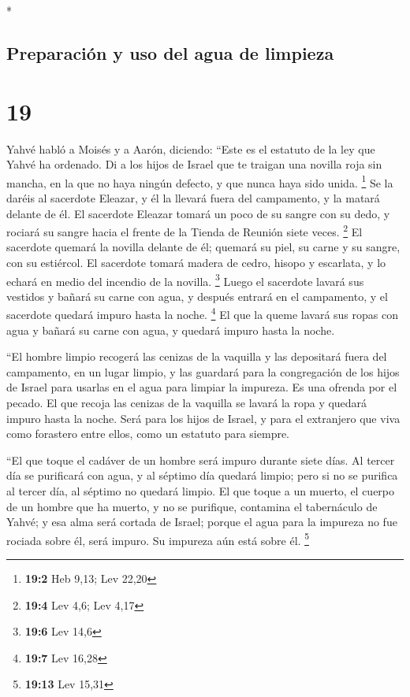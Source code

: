 \begin{paracol}{2}
\begin{otherlanguage}{english}
\end{otherlanguage}

\switchcolumn[0]*

\hypertarget{preparaciuxf3n-y-uso-del-agua-de-limpieza}{%
\subsection{Preparación y uso del agua de
limpieza}\label{preparaciuxf3n-y-uso-del-agua-de-limpieza}}

\hypertarget{section-36}{%
\section{19}\label{section-36}}

 Yahvé habló a Moisés y a Aarón, diciendo: 
``Este es el estatuto de la ley que Yahvé ha ordenado. Di a los hijos de
Israel que te traigan una novilla roja sin mancha, en la que no haya
ningún defecto, y que nunca haya sido unida. \footnote{\textbf{19:2} Heb
  9,13; Lev 22,20}  Se la daréis al sacerdote Eleazar, y
él la llevará fuera del campamento, y la matará delante de él.
 El sacerdote Eleazar tomará un poco de su sangre con su
dedo, y rociará su sangre hacia el frente de la Tienda de Reunión siete
veces. \footnote{\textbf{19:4} Lev 4,6; Lev 4,17}  El
sacerdote quemará la novilla delante de él; quemará su piel, su carne y
su sangre, con su estiércol.  El sacerdote tomará madera
de cedro, hisopo y escarlata, y lo echará en medio del incendio de la
novilla. \footnote{\textbf{19:6} Lev 14,6}  Luego el
sacerdote lavará sus vestidos y bañará su carne con agua, y después
entrará en el campamento, y el sacerdote quedará impuro hasta la noche.
\footnote{\textbf{19:7} Lev 16,28}  El que la queme lavará
sus ropas con agua y bañará su carne con agua, y quedará impuro hasta la
noche.

 ``El hombre limpio recogerá las cenizas de la vaquilla y
las depositará fuera del campamento, en un lugar limpio, y las guardará
para la congregación de los hijos de Israel para usarlas en el agua para
limpiar la impureza. Es una ofrenda por el pecado.  El
que recoja las cenizas de la vaquilla se lavará la ropa y quedará impuro
hasta la noche. Será para los hijos de Israel, y para el extranjero que
viva como forastero entre ellos, como un estatuto para siempre.

 ``El que toque el cadáver de un hombre será impuro
durante siete días.  Al tercer día se purificará con
agua, y al séptimo día quedará limpio; pero si no se purifica al tercer
día, al séptimo no quedará limpio.  El que toque a un
muerto, el cuerpo de un hombre que ha muerto, y no se purifique,
contamina el tabernáculo de Yahvé; y esa alma será cortada de Israel;
porque el agua para la impureza no fue rociada sobre él, será impuro. Su
impureza aún está sobre él. \footnote{\textbf{19:13} Lev 15,31}


\end{paracol}

